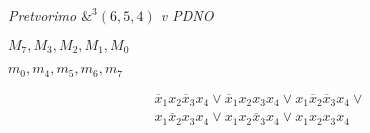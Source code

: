 \documentclass[a4paper]{report}
\begin{document}
\textit{Pretvorimo $\&^3(6,5,4)$ v PDNO}

$M_7, M_3, M_2, M_1, M_0$

$m_0, m_4, m_5, m_6, m_7$

\begin{align*}
\overline x_1 x_2 \overline x_3 x_4 \vee \overline x_1 x_2 x_3 x_4 \vee  x_1 \overline x_2 \overline x_3 x_4 \vee\\ x_1 \overline x_2  x_3 x_4 \vee x_1  x_2 \overline x_3 x_4 \vee x_1 x_2  x_3 x_4
\end{align*}
\end{document}
